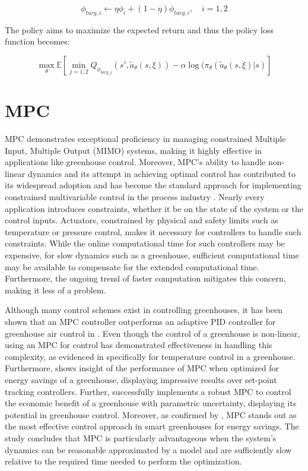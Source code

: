 \begin{equation}
	\phi_{targ,i} \leftarrow \eta \phi_{i} + (1-\eta)\phi_{targ,i}, \quad i = 1,2
\end{equation}


The policy aims to maximize the expected return and thus the policy loss function becomes:

\begin{equation}
	\max_{\theta} \mathbb{E} \left[\min_{j = 1,2} Q_{\phi_{targ,j}}(s', \tilde{a}_{\theta} (s, \xi)) - \alpha \log (\pi_\theta (\tilde{a}_{\theta} (s, \xi)| s)    \right]
\end{equation}


\section{MPC}\label{section:MPC}
MPC demonstrates exceptional proficiency in managing constrained Multiple Input, Multiple Output (MIMO) systems, making it highly effective in applications like greenhouse control. Moreover, MPC's ability to handle non-linear dynamics and its attempt in achieving optimal control has contributed to its widespread adoption and has become the standard approach for implementing constrained multivariable control in the process industry \cite{daiDiscreteTimeModelPredictive2012}. Nearly every application introduces constraints, whether it be on the state of the system or the control inputs. Actuators, constrained by physical and safety limits such as temperature or pressure control, makes it necessary for controllers to handle such constraints. While the online computational time for such controllers may be expensive, for slow dynamics such as a greenhouse, sufficient computational time may be available to compensate for the extended computational time. Furthermore, the ongoing trend of faster computation mitigates this concern, making it less of a problem.

Although many control schemes exist in controlling greenhouses, it has been shown that an MPC controller outperforms an adaptive PID controller for greenhouse air control in \cite{ghoumariNonlinearConstrainedMPC2005}. Even though the control of a greenhouse is non-linear, using an MPC for control has demonstrated effectiveness in handling this complexity, as evidenced in \cite{gruberNonlinearMPCBased2011, montoyaHybridcontrolledApproachMaintaining2016} specifically for temperature control in a greenhouse. Furthermore, \cite{bersaniModelPredictiveControl2020} shows insight of the performance of MPC when optimized for energy savings of a greenhouse, displaying impressive results over set-point tracking controllers. Further, \cite{boersmaRobustSamplebasedModel2022} successfully implements a robust MPC to control the economic benefit of a greenhouse with parametric uncertainty, displaying its potential in greenhouse control. Moreover, as confirmed by \cite{bersaniModelPredictiveControl2020}, MPC stands out as the most effective control approach in smart greenhouses for energy savings. The study concludes that MPC is particularly advantageous when the system's dynamics can be reasonable approximated by a model and are sufficiently slow relative to the required time needed to perform the optimization.

